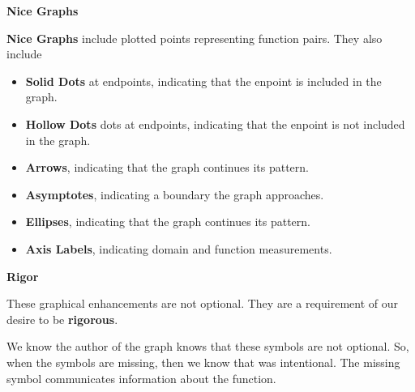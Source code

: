 \documentclass{ximera}
\begin{document}
\begin{summary} \textbf{\textcolor{red!70!yellow}{Nice Graphs}}

\textbf{Nice Graphs} include plotted points representing function pairs.  They also include

\begin{itemize}
\item \textbf{Solid Dots} at endpoints, indicating that the enpoint is included in the graph.
\item \textbf{Hollow Dots} dots at endpoints, indicating that the enpoint is not included in the graph.
\item \textbf{Arrows}, indicating that the graph continues its pattern.
\item \textbf{Asymptotes}, indicating a boundary the graph approaches.
\item \textbf{Ellipses}, indicating that the graph continues its pattern.
\item \textbf{Axis Labels}, indicating domain and function measurements.
\end{itemize}

\end{summary}





\begin{warning} \textbf{\textcolor{red!70!black}{Rigor}}

These graphical enhancements are not optional.  They are a requirement of our desire to be \textbf{\textcolor{purple!85!blue}{rigorous}}.

We know the author of the graph knows that these symbols are not optional. So, when the symbols are missing, then we know that was intentional.  The missing symbol communicates information about the function.

\end{warning}
\end{document}
